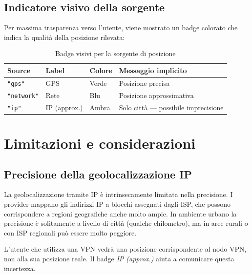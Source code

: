\documentclass[12pt, a4paper]{article}
\begin{document}
\subsection{Indicatore visivo della sorgente}

Per massima trasparenza verso l'utente, viene mostrato un badge colorato che
indica la qualità della posizione rilevata:

\begin{table}[h!]
  \centering
  \caption{Badge visivi per la sorgente di posizione}
  \begin{tabularx}{\linewidth}{C{2cm} C{2.5cm} C{2.5cm} L{5cm}}
    \toprule
    \textbf{Source} & \textbf{Label} & \textbf{Colore} & \textbf{Messaggio implicito} \\
    \midrule
    \texttt{"gps"}     & GPS           & Verde  & Posizione precisa \\
    \texttt{"network"} & Rete          & Blu    & Posizione approssimativa \\
    \texttt{"ip"}      & IP (approx.)  & Ambra  & Solo città — possibile imprecisione \\
    \bottomrule
  \end{tabularx}
\end{table}

\section{Limitazioni e considerazioni}

\subsection{Precisione della geolocalizzazione IP}

La geolocalizzazione tramite IP è intrinsecamente limitata nella precisione.
I provider mappano gli indirizzi IP a blocchi assegnati dagli ISP, che
possono corrispondere a regioni geografiche anche molto ampie. In ambiente
urbano la precisione è solitamente a livello di città (qualche chilometro),
ma in aree rurali o con ISP regionali può essere molto peggiore.

\begin{warningbox}
L'utente che utilizza una VPN vedrà una posizione corrispondente al nodo VPN,
non alla sua posizione reale. Il badge \textit{IP (approx.)} aiuta a
comunicare questa incertezza.
\end{warningbox}
\end{document}
